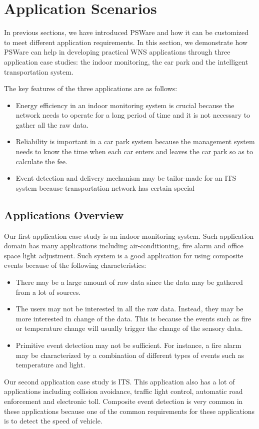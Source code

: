 \section{Application Scenarios}
\label{sec:pswareImpl}
In previous sections, we have introduced PSWare and how it can be customized to meet different application requirements. In this section, we demonstrate how PSWare can help in developing practical WNS applications through three application case studies: the indoor monitoring, the car park and the intelligent transportation system.

The key features of the three applications are as follows:
\begin{itemize}
\item Energy efficiency in an indoor monitoring system is crucial because the network needs to operate for a long period of time and it is not necessary to gather all the raw data.
\item Reliability is important in a car park system because the management system needs to know the time when each car enters and leaves the car park so as to calculate the fee.
\item Event detection and delivery mechanism may be tailor-made for an ITS system because transportation network has certain special 
\end{itemize}


\subsection{Applications Overview}
Our first application case study is an indoor monitoring system. Such application domain has many applications including air-conditioning, fire alarm and office space light adjustment. Such system is a good application for using composite events because of the following characteristics:
\begin{itemize}
\item There may be a large amount of raw data since the data may be gathered from a lot of sources.
\item The users may not be interested in all the raw data. Instead, they may be more interested in change of the data. This is because the events such as fire or temperature change will usually trigger the change of the sensory data. 
\item Primitive event detection may not be sufficient. For instance, a fire alarm may be characterized by a combination of different types of events such as temperature and light.
\end{itemize}

Our second application case study is ITS. This application also has a lot of applications including collision avoidance, traffic light control, automatic road enforcement and electronic toll. Composite event detection is very common in these applications because one of the common requirements for these applications is to detect the speed of vehicle.